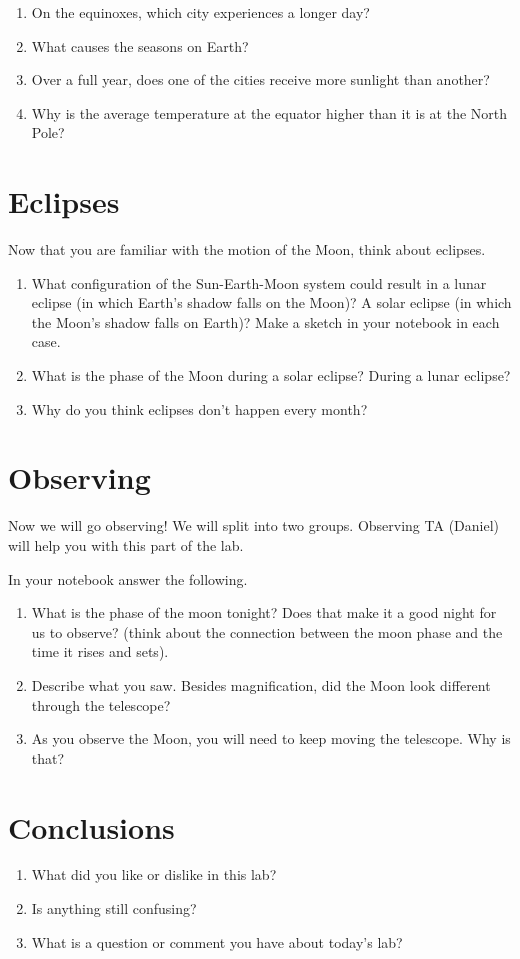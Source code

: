\documentclass[12pt]{article}%
\begin{document}
\begin{enumerate}
\item On the equinoxes, which city experiences a longer day?
\item What causes the seasons on Earth?
\item Over a full year, does one of the cities receive more sunlight than another?
\item Why is the average temperature at the equator higher than it is at the North Pole?
\end{enumerate}

\section{Eclipses}
Now that you are familiar with the motion of the Moon, think about eclipses.
\begin{enumerate}
    \item What configuration of the Sun-Earth-Moon system could result in a lunar eclipse (in which Earth’s shadow falls on the Moon)? A solar eclipse (in which the Moon’s shadow falls on Earth)? Make a sketch in your notebook in each case.
    \item What is the phase of the Moon during a solar eclipse? During a lunar eclipse?
    \item Why do you think eclipses don't happen every month? 
\end{enumerate}

\section{Observing}
Now we will go observing! We will split into two groups. Observing TA (Daniel) will help you with this part of the lab. 

In your notebook answer the following. 
\begin{enumerate}
    \item What is the phase of the moon tonight? Does that make it a good night for us to observe? (think about the connection between the moon phase and the time it rises and sets).
    \item Describe what you saw. Besides magnification, did the Moon look different through the telescope?
    \item As you observe the Moon, you will need to keep moving the telescope. Why is that?
\end{enumerate}

\section{Conclusions}
\begin{enumerate}
    \item What did you like or dislike in this lab?
    \item Is anything still confusing?
    \item What is a question or comment you have about today’s lab?
\end{enumerate}
\end{document}
